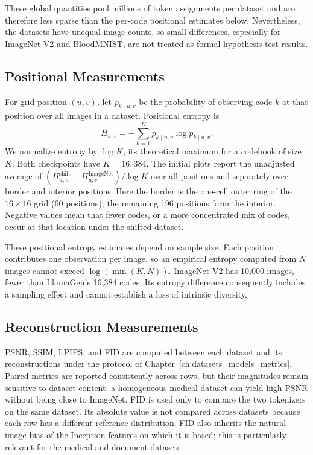 These global quantities pool millions of token assignments per dataset and
are therefore less sparse than the per-code positional estimates below.
Nevertheless, the datasets have unequal image counts, so small differences,
especially for ImageNet-V2 and BloodMNIST, are not treated as formal
hypothesis-test results.

\subsection{Positional Measurements}
\label{subsec:rq5_positional_metrics}

For grid position $(u,v)$, let $p_{k\mid u,v}$ be the probability of observing
code $k$ at that position over all images in a dataset. Positional entropy is
\begin{equation}
    H_{u,v}=-\sum_{k=1}^{K}p_{k\mid u,v}\log p_{k\mid u,v}.
    \label{eq:rq5_positional_entropy}
\end{equation}
We normalize entropy by $\log K$, its theoretical maximum for a codebook of
size $K$. Both checkpoints have $K=16{,}384$. The initial plots report the
unadjusted average of
$(H^{\mathrm{shift}}_{u,v}-H^{\mathrm{ImageNet}}_{u,v})/\log K$ over all
positions and separately over border and interior positions.
Here the border is the one-cell outer ring of the $16\times16$ grid (60
positions); the remaining 196 positions form the interior.
Negative values mean that fewer codes, or a more concentrated mix of codes,
occur at that location under the shifted dataset.

These positional entropy estimates depend on sample size. Each position
contributes one observation per image, so an empirical entropy computed from
$N$ images cannot exceed $\log(\min(K,N))$. ImageNet-V2 has 10{,}000 images,
fewer than LlamaGen's 16{,}384 codes. Its entropy difference consequently
includes a sampling effect and cannot establish a loss of intrinsic diversity.

\subsection{Reconstruction Measurements}
\label{subsec:rq5_reconstruction_metrics}

PSNR, SSIM, LPIPS, and FID are computed between each dataset and its
reconstructions under the protocol of Chapter~\ref{ch:datasets_models_metrics}.
Paired metrics are reported consistently across rows, but their magnitudes
remain sensitive to dataset content: a homogeneous medical dataset can yield
high PSNR without being close to ImageNet. FID is used only to compare the two
tokenizers on the same dataset.
Its absolute value is not compared across datasets because each row has a
different reference distribution. FID also inherits the natural-image bias of
the Inception features on which it is based; this is particularly relevant for
the medical and document datasets.

